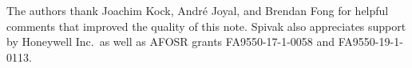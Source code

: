 \documentclass[11pt, article, one side]{memoir}
\theoremstyle{theorem}
\theoremstyle{definition}
\theoremstyle{remark}
\newcommand{\Cat}[1]{\mathsf{#1}}%
\newcommand{\ol}[1]{\overline{#1}}
\newcommand{\bun}{\Cat{Bun}}
\newcommand{\yon}{\mathcal{y}}
\newcommand{\poly}{\Cat{Poly}}
\newcommand{\dir}{\Cat{Dir}}
\newcommand{\ff}{\mathbb{F}}
\newcommand{\qqand}{\qquad\text{and}\qquad}
\begin{document}
The authors thank Joachim Kock, Andr\'{e} Joyal, and Brendan Fong for helpful comments that improved the quality of this note. Spivak also appreciates support by Honeywell Inc.\ as well as AFOSR grants FA9550-17-1-0058 and FA9550-19-1-0113.

%
%
%
\end{document}
